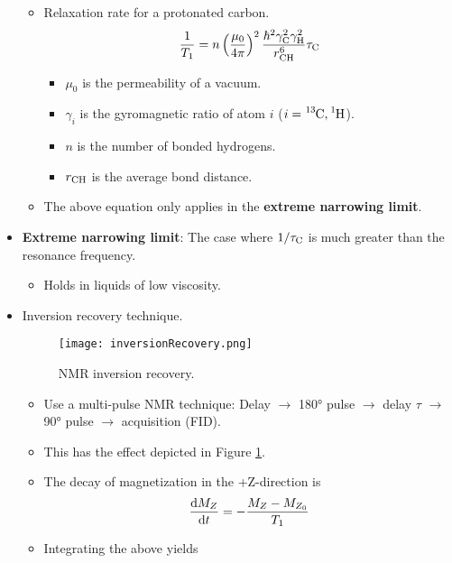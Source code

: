\documentclass[../notes.tex]{subfiles}
\begin{document}
\begin{itemize}
\begin{itemize}
        \item Relaxation rate for a protonated carbon.
        \begin{equation*}
            \frac{1}{T_1} = n\left( \frac{\mu_0}{4\pi} \right)^2\frac{\hbar^2\gamma_{\ce{C}}^2\gamma_{\ce{H}}^2}{r_{\ce{CH}}^6}\tau_{\ce{C}}
        \end{equation*}
        \begin{itemize}
            \item $\mu_0$ is the permeability of a vacuum.
            \item $\gamma_i$ is the gyromagnetic ratio of atom $i$ ($i=\ce{{}^13C},\ce{{}^1H}$).
            \item $n$ is the number of bonded hydrogens.
            \item $r_{\ce{CH}}$ is the average  bond distance.
        \end{itemize}
        \item The above equation only applies in the \textbf{extreme narrowing limit}.
    \end{itemize}
    \item \textbf{Extreme narrowing limit}: The case where $1/\tau_{\ce{C}}$ is much greater than the resonance frequency.
    \begin{itemize}
        \item Holds in liquids of low viscosity.
    \end{itemize}
    \item Inversion recovery technique.
    \begin{figure}[h!]
        \centering
        \texttt{[image: inversionRecovery.png]}
        \caption{NMR inversion recovery.}
        \label{fig:inversionRecovery}
    \end{figure}
    \begin{itemize}
        \item Use a multi-pulse NMR technique: Delay $\to$ \ang{180} pulse $\to$ delay $\tau$ $\to$ \ang{90} pulse $\to$ acquisition (FID).
        \item This has the effect depicted in Figure \ref{fig:inversionRecovery}.
        \item The decay of magnetization in the +Z-direction is
        \begin{equation*}
            \dv{M_Z}{t} = -\frac{M_Z-M_{Z_0}}{T_1}
        \end{equation*}
        \item Integrating the above yields
        \begin{equation*}

\end{equation*}
\end{itemize}
\end{itemize}
\end{document}
